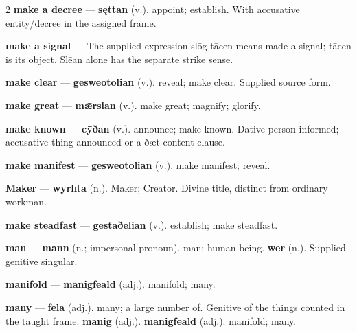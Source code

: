 \begin{multicols}{2}
\textbf{make a decree} — \textbf{sęttan} (v.). appoint; establish. With accusative entity/decree in the assigned frame.\par
\textbf{make a signal} — The supplied expression slōg tācen means made a signal; tācen is its object. Slēan alone has the separate strike sense.\par
\textbf{make clear} — \textbf{gesweotolian} (v.). reveal; make clear. Supplied source form.\par
\textbf{make great} — \textbf{mǣrsian} (v.). make great; magnify; glorify.\par
\textbf{make known} — \textbf{cȳðan} (v.). announce; make known. Dative person informed; accusative thing announced or a ðæt content clause.\par
\textbf{make manifest} — \textbf{gesweotolian} (v.). make manifest; reveal.\par
\textbf{Maker} — \textbf{wyrhta} (n.). Maker; Creator. Divine title, distinct from ordinary workman.\par
\textbf{make steadfast} — \textbf{gestaðelian} (v.). establish; make steadfast.\par
\textbf{man} — \textbf{mann} (n.; impersonal pronoun). man; human being. \textbf{wer} (n.). Supplied genitive singular.\par
\textbf{manifold} — \textbf{manigfeald} (adj.). manifold; many.\par
\textbf{many} — \textbf{fela} (adj.). many; a large number of. Genitive of the things counted in the taught frame. \textbf{manig} (adj.).  \textbf{manigfeald} (adj.). manifold; many.\par

\end{multicols}
